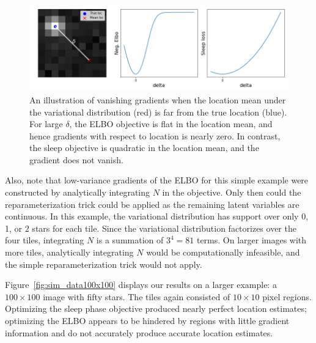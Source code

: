 \begin{figure}[!htb]
    \centering
    \includegraphics[width=\textwidth]{figures/gradzero_cartoon3.png}
    \caption{An illustration of vanishing gradients when the location mean under the variational distribution (red) is far from the true location (blue). 
    For large $\delta$, the ELBO objective is flat in the location mean,
    and hence gradients with respect to location is nearly zero. 
    In contrast, the sleep objective is quadratic in the location mean, and the gradient does not vanish. }
    \label{fig:gradzero_cartoon}
\end{figure}

Also, note that low-variance gradients of the ELBO for this simple example were constructed by analytically integrating $N$ in the objective. Only then could the reparameterization trick could be applied as the remaining latent variables are continuous. 
In this example, the variational distribution has support over only 0, 1, or 2 stars for each tile. 
Since the variational distribution factorizes over the four tiles, integrating $N$ is a summation of $3^4 = 81$ terms.
On larger images with more tiles, analytically integrating $N$ would be computationally infeasible, 
and the simple reparameterization trick would not apply. 

Figure~\ref{fig:sim_data100x100} displays our results on a larger example: a $100\times 100$ image with fifty stars. 
The tiles again consisted of $10\times 10$ pixel regions. 
Optimizing the sleep phase objective produced nearly perfect location estimates; 
optimizing the ELBO appears to be hindered by regions with little gradient information and do not accurately produce accurate location estimates. 

